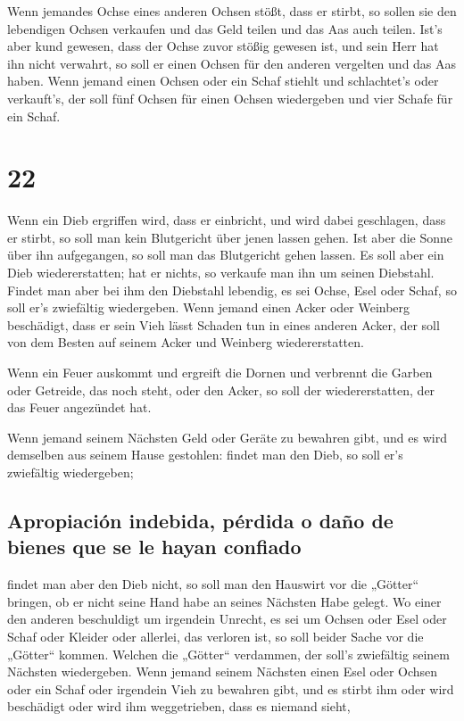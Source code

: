  Wenn jemandes Ochse eines anderen Ochsen stößt, dass er
stirbt, so sollen sie den lebendigen Ochsen verkaufen und das Geld
teilen und das Aas auch teilen.  Ist's aber kund gewesen,
dass der Ochse zuvor stößig gewesen ist, und sein Herr hat ihn nicht
verwahrt, so soll er einen Ochsen für den anderen vergelten und das Aas
haben.  Wenn jemand einen Ochsen oder ein Schaf stiehlt
und schlachtet's oder verkauft's, der soll fünf Ochsen für einen Ochsen
wiedergeben und vier Schafe für ein Schaf.

\hypertarget{section-21}{%
\section{22}\label{section-21}}

 Wenn ein Dieb ergriffen wird, dass er einbricht, und wird
dabei geschlagen, dass er stirbt, so soll man kein Blutgericht über
jenen lassen gehen.  Ist aber die Sonne über ihn
aufgegangen, so soll man das Blutgericht gehen lassen. Es soll aber ein
Dieb wiedererstatten; hat er nichts, so verkaufe man ihn um seinen
Diebstahl.  Findet man aber bei ihm den Diebstahl
lebendig, es sei Ochse, Esel oder Schaf, so soll er's zwiefältig
wiedergeben.  Wenn jemand einen Acker oder Weinberg
beschädigt, dass er sein Vieh lässt Schaden tun in eines anderen Acker,
der soll von dem Besten auf seinem Acker und Weinberg wiedererstatten.

 Wenn ein Feuer auskommt und ergreift die Dornen und
verbrennt die Garben oder Getreide, das noch steht, oder den Acker, so
soll der wiedererstatten, der das Feuer angezündet hat.

 Wenn jemand seinem Nächsten Geld oder Geräte zu bewahren
gibt, und es wird demselben aus seinem Hause gestohlen: findet man den
Dieb, so soll er's zwiefältig wiedergeben;

\hypertarget{apropiaciuxf3n-indebida-puxe9rdida-o-dauxf1o-de-bienes-que-se-le-hayan-confiado}{%
\subsection{Apropiación indebida, pérdida o daño de bienes que se le
hayan
confiado}\label{apropiaciuxf3n-indebida-puxe9rdida-o-dauxf1o-de-bienes-que-se-le-hayan-confiado}}

 findet man aber den Dieb nicht, so soll man den Hauswirt
vor die „Götter`` bringen, ob er nicht seine Hand habe an seines
Nächsten Habe gelegt.  Wo einer den anderen beschuldigt um
irgendein Unrecht, es sei um Ochsen oder Esel oder Schaf oder Kleider
oder allerlei, das verloren ist, so soll beider Sache vor die „Götter``
kommen. Welchen die „Götter`` verdammen, der soll's zwiefältig seinem
Nächsten wiedergeben.  Wenn jemand seinem Nächsten einen
Esel oder Ochsen oder ein Schaf oder irgendein Vieh zu bewahren gibt,
und es stirbt ihm oder wird beschädigt oder wird ihm weggetrieben, dass
es niemand sieht,


